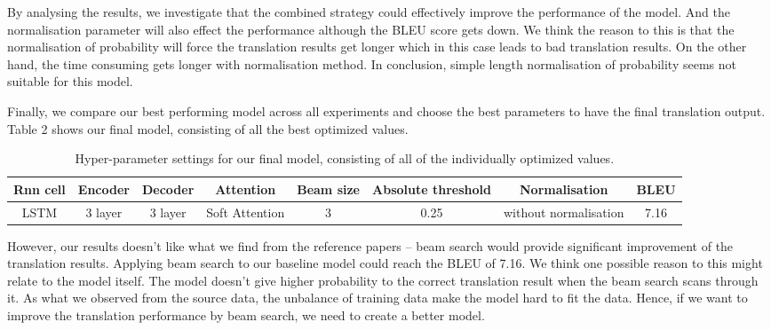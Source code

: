 \documentclass[a4paper]{article}
\begin{document}
By analysing the results, we investigate that the combined strategy could effectively improve the performance of the model. And the normalisation parameter will also effect the performance although the BLEU score gets down. We think the reason to this is that the normalisation of probability will force the translation results get longer which in this case leads to bad translation results. On the other hand, the time consuming gets longer with normalisation method. In conclusion, simple length normalisation of probability seems not suitable for this model.

Finally, we compare our best performing model across all experiments and choose the best parameters to have the final translation output. Table 2 shows our final model, consisting of all the best optimized values. 
\begin{table}[H]
\centering
\caption{Hyper-parameter settings for our final
model, consisting of all of the individually
optimized values.}
\begin{tabular}{@{}cccccccc@{}}
\toprule
Rnn cell & Encoder & Decoder & Attention      & Beam size &  Absolute threshold & Normalisation & BLEU \\ \midrule
LSTM     & 3 layer & 3 layer & Soft Attention &     3     &        0.25         &      without normalisation & 7.16 \\
\bottomrule
\end{tabular}
\end{table}

However, our results doesn't like what we find from the reference papers -- beam search would provide significant improvement of the translation results. Applying beam search to our baseline model could reach the BLEU of 7.16. We think one possible reason to this might relate to the model itself. The model doesn't give higher probability to the correct translation result when the beam search scans through it. As what we observed from the source data, the unbalance of training data make the model hard to fit the data. Hence, if we want to improve the translation performance by beam search, we need to create a better model. 
\end{document}
